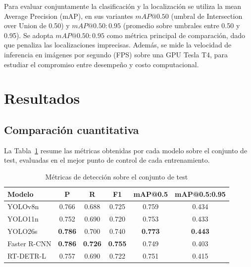 \documentclass[conference]{IEEEtran}
\begin{document}
Para evaluar conjuntamente la clasificación y la localización se utiliza la
mean Average Precision (mAP), en sus variantes $mAP@0.50$ (umbral de
Intersection over Union de 0.50) y $mAP@0.50:0.95$ (promedio sobre umbrales
entre 0.50 y 0.95). Se adopta $mAP@0.50:0.95$ como métrica principal de
comparación, dado que penaliza las localizaciones imprecisas. Además, se
mide la velocidad de inferencia en imágenes por segundo (FPS) sobre una GPU
Tesla T4, para estudiar el compromiso entre desempeño y costo
computacional.



\section{Resultados}\label{sec:resultados}

\subsection{Comparación cuantitativa}

La Tabla~\ref{tab:metricas} resume las métricas obtenidas por cada modelo
sobre el conjunto de test, evaluadas en el mejor punto de control de cada
entrenamiento.

\begin{table}[htbp]
\caption{Métricas de detección sobre el conjunto de test}
\begin{center}
\begin{tabular}{|l|c|c|c|c|c|}
\hline
\textbf{Modelo} & \textbf{P} & \textbf{R} & \textbf{F1} &
\textbf{mAP@0.5} & \textbf{mAP@0.5:0.95} \\
\hline
YOLOv8n      & 0.766 & 0.688 & 0.725 & 0.759 & 0.434 \\
\hline
YOLO11n      & 0.752 & 0.690 & 0.720 & 0.753 & 0.433 \\
\hline
YOLO26s      & \textbf{0.786} & 0.700 & 0.740 & \textbf{0.773} & \textbf{0.443} \\
\hline
Faster R-CNN & \textbf{0.786} & \textbf{0.726} & \textbf{0.755} & 0.749 & 0.403 \\
\hline
RT-DETR-L    & 0.757 & 0.690 & 0.722 & 0.751 & 0.415 \\
\hline
\end{tabular}
\label{tab:metricas}
\end{center}
\end{table}
\end{document}
